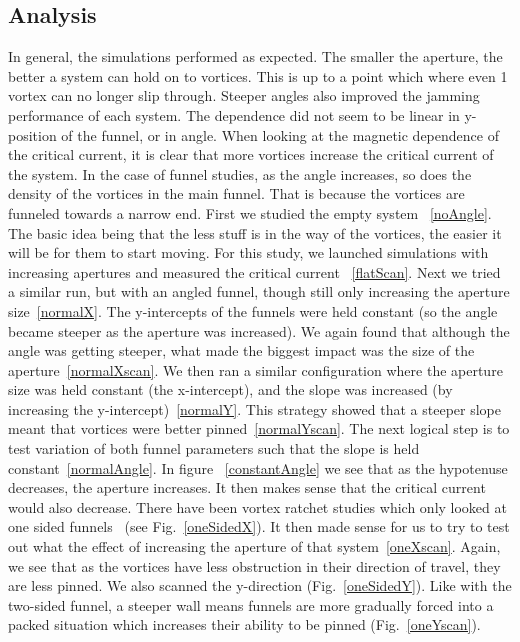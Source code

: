 \subsection{Analysis}
In general, the simulations performed as expected. The smaller the aperture, the better a system can hold on to vortices. This is up to a point which where even 1 vortex can no longer slip through. Steeper angles also improved the jamming performance of each system. The dependence did not seem to be linear in y-position of the funnel, or in angle. When looking at the magnetic dependence of the critical current, it is clear that more vortices increase the critical current of the system. In the case of funnel studies, as the angle increases, so does the density of the vortices in the main funnel. That is because the vortices are funneled towards a narrow end. First we studied the empty system ~\ref{noAngle}. The basic idea being that the less stuff is in the way of the vortices, the easier it will be for them to start moving. For this study, we launched simulations with increasing apertures and measured the critical current ~\ref{flatScan}. Next we tried a similar run, but with an angled funnel, though still only increasing the aperture size~\ref{normalX}. The y-intercepts of the funnels were held constant (so the angle became steeper as the aperture was increased). We again found that although the angle was getting steeper, what made the biggest impact was the size of the aperture~\ref{normalXscan}. We then ran a similar configuration where the aperture size was held constant (the x-intercept), and the slope was increased (by increasing the y-intercept)~\ref{normalY}. This strategy showed that a steeper slope meant that vortices were better pinned~\ref{normalYscan}. The next logical step is to test variation of both funnel parameters such that the slope is held constant~\ref{normalAngle}. In figure ~\ref{constantAngle} we see that as the hypotenuse decreases, the aperture increases. It then makes sense that the critical current would also decrease. There have been vortex ratchet studies which only looked at one sided funnels~\cite{Plourde09} (see Fig.~\ref{oneSidedX}). It then made sense for us to try to test out what the effect of increasing the aperture of that system~\ref{oneXscan}. Again, we see that as the vortices have less obstruction in their direction of travel, they are less pinned. We also scanned the y-direction (Fig.~\ref{oneSidedY}). Like with the two-sided funnel, a steeper wall means funnels are more gradually forced into a packed situation which increases their ability to be pinned (Fig.~\ref{oneYscan}). 

